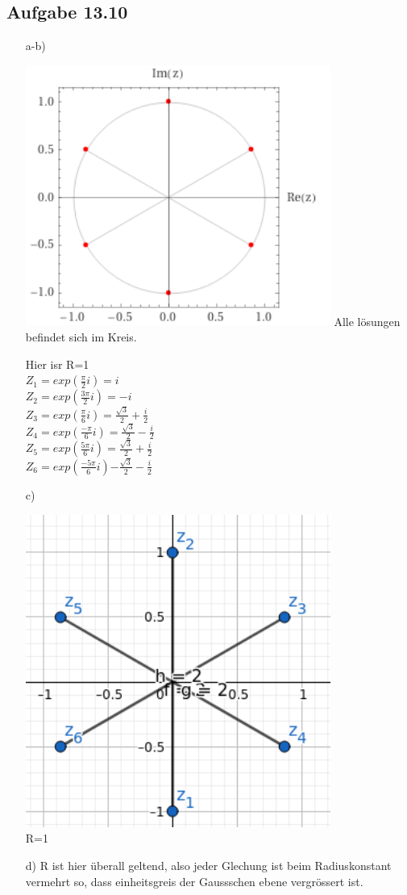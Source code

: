 \documentclass{standalone}
\begin{document}
\subsection{Aufgabe 13.10}
\begin{itemize}
	\item[a-b)]
		\begin{center}
		\includegraphics[width=10cm]{img/13_10.png}
		Alle lösungen befindet sich im Kreis.\\
	\end{center}
	Hier isr R=1\\
	$Z_1=exp(\frac{\pi}{2}i)=i$\\
	$Z_2=exp(\frac{3\pi}{2}i)=-i$\\
	$Z_3=exp(\frac{\pi}{6}i)=\frac{\sqrt{3}}{2}+\frac{i}{2}$\\
	$Z_4=exp(\frac{-\pi}{6}i)=\frac{\sqrt{3}}{2}-\frac{i}{2}$\\
	$Z_5=exp(\frac{5\pi}{6}i)$$=\frac{\sqrt{3}}{2}+\frac{i}{2}$\\
	$Z_6=exp(\frac{-5\pi}{6}i)$$-\frac{\sqrt{3}}{2}-\frac{i}{2}$\\
	
	\item[c)]
	\begin{center}
		\includegraphics[width=10cm]{img/13_10_c.png}\\
		R=1\\
	\end{center}
	\item[d)] R ist hier überall geltend, also jeder Glechung ist beim Radiuskonstant vermehrt so, dass einheitsgreis der Gaussschen ebene vergrössert ist.\\	
\end{itemize}
\end{document}

